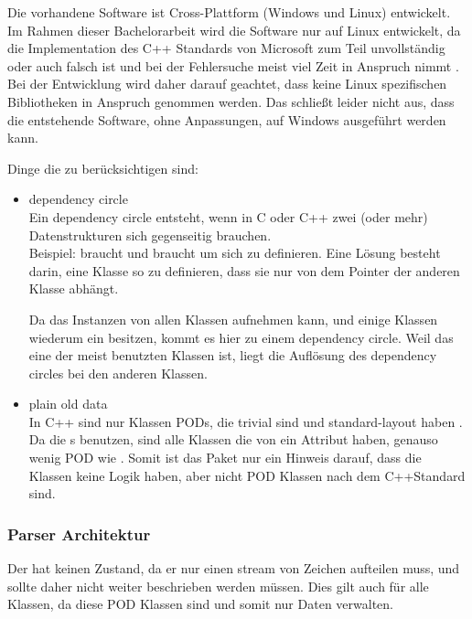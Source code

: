       Die vorhandene Software ist Cross-Plattform (Windows und Linux) entwickelt. Im Rahmen dieser Bachelorarbeit wird die Software nur auf Linux entwickelt, da die Implementation des C++ Standards von Microsoft zum Teil unvollständig oder auch falsch ist und bei der Fehlersuche meist viel Zeit in Anspruch nimmt \autocite{new-ms-compiler}. Bei der Entwicklung wird daher darauf geachtet, dass keine Linux spezifischen Bibliotheken in Anspruch genommen werden. Das schließt leider nicht aus, dass die entstehende Software, ohne Anpassungen, auf Windows ausgeführt werden kann.

      Dinge die zu berücksichtigen sind:
      \begin{itemize}
        \item dependency circle\\
          Ein dependency circle entsteht, wenn in C oder C++ zwei (oder mehr) Datenstrukturen sich gegenseitig brauchen.\\
          Beispiel:  braucht  und  braucht  um sich zu definieren. Eine Lösung besteht darin, eine Klasse so zu definieren, dass sie nur von dem Pointer der anderen Klasse abhängt.

          Da das  Instanzen von allen  Klassen aufnehmen kann, und einige Klassen wiederum ein  besitzen, kommt es hier zu einem dependency circle. Weil das  eine der meist benutzten Klassen ist, liegt die Auflösung des dependency circles bei den anderen Klassen.
        \item plain old data\\
          In C++ sind nur Klassen PODs, die trivial sind und standard-layout haben \autocite[9 Classes §10]{C++14-std}. Da die s  benutzen, sind alle Klassen die von  ein Attribut haben, genauso wenig POD wie . Somit ist das  Paket nur ein Hinweis darauf, dass die Klassen keine Logik haben, aber nicht POD Klassen nach dem C++Standard sind.
      \end{itemize}

    \subsubsection{Parser Architektur}
    \label{sssec:Parser Architektur}
      Der  hat keinen Zustand, da er nur einen stream von Zeichen aufteilen muss, und sollte daher nicht weiter beschrieben werden müssen. Dies gilt auch für alle  Klassen, da diese POD Klassen sind und somit nur Daten verwalten.

